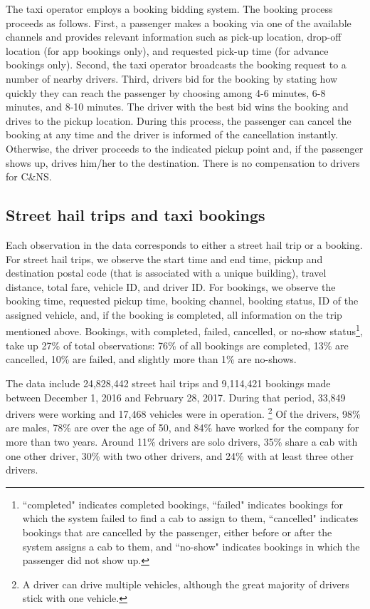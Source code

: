 \documentclass[reviewmode,AEJ]{AEA}
\begin{document}
The taxi operator employs a booking bidding system. The booking process proceeds as follows. 
First, a passenger makes a booking via one of the available channels and provides relevant information 
such as pick-up location, drop-off location (for app bookings only), and requested pick-up time 
(for advance bookings only). Second, the taxi operator broadcasts the booking request to a number of 
nearby drivers. Third, drivers bid for the booking by stating how quickly they can reach the passenger 
by choosing among 4-6 minutes, 6-8 minutes, and 8-10 minutes. The driver with the best bid wins the
booking and drives to the pickup location. During this process, the passenger can cancel the booking
at any time and the driver is informed of the cancellation instantly. Otherwise, the driver proceeds
to the indicated pickup point and, if the passenger shows up, drives him/her to the destination. 
There is no compensation to drivers for C\&NS.

\subsection{Street hail trips and taxi bookings}
Each observation in the data corresponds to either a street hail trip or a booking. For street hail trips, 
we observe the start time and end time, pickup and destination postal code (that is associated with a unique building), 
travel distance, total fare, vehicle ID, and driver ID. For bookings, we observe the booking time, 
requested pickup time, booking channel, booking status,  ID of the assigned vehicle, and, if the booking
is completed, all information on the trip mentioned above. Bookings, with completed, failed, cancelled, 
or no-show status\footnote{``completed" indicates completed bookings, ``failed" indicates bookings for
which the system failed to find a cab to assign to them, ``cancelled" indicates bookings that are cancelled
by the passenger, either before or after the system assigns a cab to them, and ``no-show" indicates bookings 
in which the passenger did not show up.}, take up 27\% of  total observations: 76\% of all bookings are 
completed, 13\% are cancelled, 10\% are failed, and slightly more than 1\% are no-shows.

The data include 24,828,442 street hail trips and 9,114,421 bookings made between December 1, 2016 and
February 28, 2017. During that period, 33,849 drivers were working and 17,468 vehicles were in operation.%
\footnote{A driver can drive multiple vehicles, although the great majority of drivers stick with one vehicle.} 
Of the drivers, 98\% are males, 78\% are over the age of 50, and 84\% have worked for the company for more than
two years. Around 11\% drivers are solo drivers, 35\% share a cab with one other driver, 30\% with two other 
drivers, and 24\% with at least three other drivers.
\end{document}
